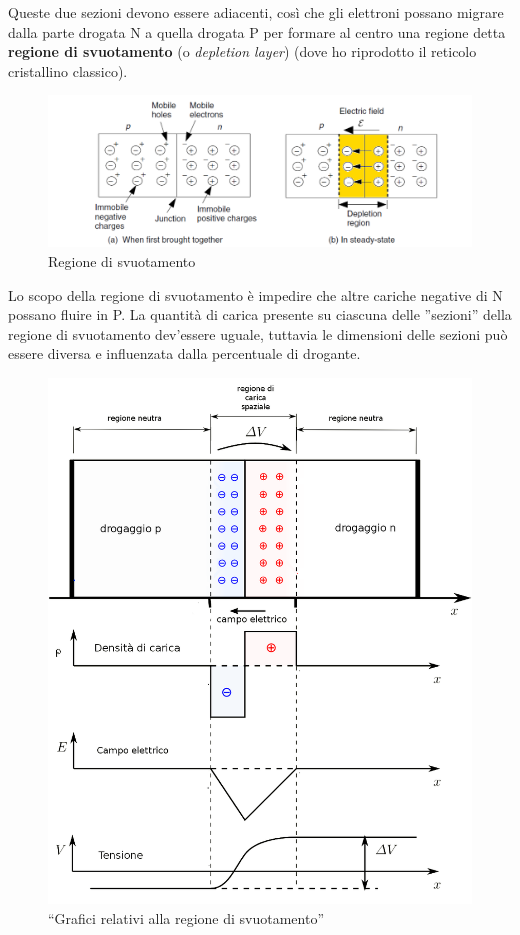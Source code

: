 \documentclass[
]{book}
\begin{document}
Queste due sezioni devono essere adiacenti, così che gli elettroni
possano migrare dalla parte drogata N a quella drogata P per formare al
centro una regione detta \textbf{regione di svuotamento} (o
\emph{depletion layer}) (dove ho riprodotto il reticolo cristallino
classico).

\begin{figure}
\centering
\includegraphics[width=0.68\linewidth,height=\textheight,keepaspectratio]{immagini/1.png}
\caption{Regione di svuotamento}
\end{figure}

Lo scopo della regione di svuotamento è impedire che altre cariche
negative di N possano fluire in P. La quantità di carica presente su
ciascuna delle ''sezioni'' della regione di svuotamento dev'essere
uguale, tuttavia le dimensioni delle sezioni può essere diversa e
influenzata dalla percentuale di drogante.

\begin{figure}
\centering
\includegraphics[width=\linewidth,height=0.35\textheight,keepaspectratio]{immagini/2.png}
\caption{``Grafici relativi alla regione di svuotamento''}
\end{figure}
\end{document}
